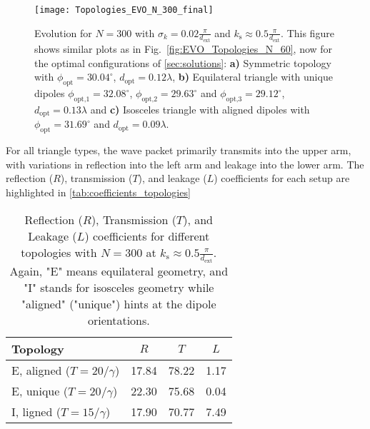\begin{figure}[!ht]
    \centering
    \texttt{[image: Topologies\_EVO\_N\_300\_final]}
    \caption{Evolution for $ N = 300 $ with $ \sigma_k = 0.02 \frac{\pi}{d_\text{ext}} $ and  $k_\text{s} \approx 0.5 \frac{\pi}{d_\text{ext}} $.
    This figure shows similar plots as in Fig.~\ref{fig:EVO_Topologies_N_60}, now for the optimal configurations of \autoref{sec:solutions}:
    \textbf{a)} Symmetric topology with \(\phi_{\text{opt}} = 30.04^\circ\), \(d_{\text{opt}} = 0.12\lambda\), \textbf{b)} Equilateral triangle with unique dipoles \(\phi_{\text{opt,1}} = 32.08^\circ\), \(\phi_{\text{opt,2}} = 29.63^\circ\) and \(\phi_{\text{opt,3}} = 29.12^\circ\), \(d_{\text{opt}} = 0.13\lambda\) and \textbf{c)} Isosceles triangle with aligned dipoles with \(\phi_{\text{opt}} = 31.69^\circ\) and \(d_{\text{opt}} = 0.09\lambda\).}
    \label{fig:EVO_Topologies}
\end{figure}


\noindent
For all triangle types, the wave packet primarily transmits into the upper arm, with variations in reflection into the left arm and leakage into the lower arm.
The reflection ($R$), transmission ($T$), and leakage ($L$) coefficients for each setup are highlighted in \autoref{tab:coefficients_topologies}

\begin{table}[h!]
\centering
\caption{Reflection ($R$), Transmission ($T$), and Leakage ($L$) coefficients for different topologies with $N = 300$ at $k_\text{s} \approx 0.5 \frac{\pi}{d_\text{ext}} $.
    Again, "E" means equilateral geometry, and "I"
    stands for isosceles geometry while "aligned" ("unique") hints at the dipole orientations.}
\begin{tabular}{@{}lccc@{}}
    \toprule
    \textbf{Topology} & \textbf{$R$} & \textbf{$T$} & \textbf{$L$} \\
    \midrule
    E, aligned ($T = 20 / \gamma$) & 17.84 & 78.22 & 1.17 \\
    E, unique ($T = 20 / \gamma$) & 22.30 & 75.68 & 0.04 \\
    I, ligned ($T = 15 / \gamma$) & 17.90 & 70.77 & 7.49 \\
    \bottomrule
\end{tabular}
\label{tab:coefficients_topologies}
\end{table}

